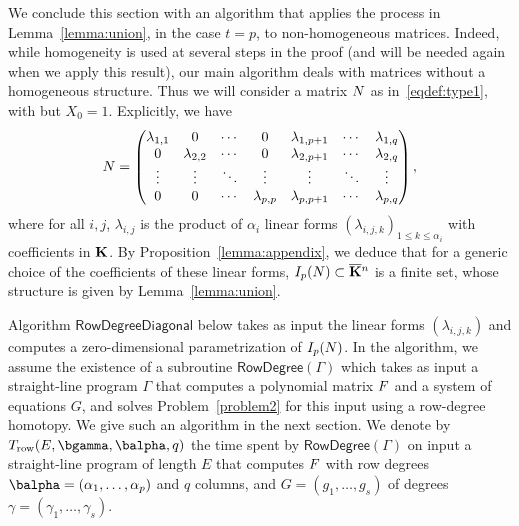 \documentclass[12pt]{article}
\begin{document}
\medskip

We conclude this section with an algorithm that applies the process
in Lemma~\ref{lemma:union}, in the case $t=p$, to non-homogeneous 
matrices. Indeed, while homogeneity is used at several steps in 
the proof (and will be needed again when we apply this result), our 
main algorithm deals with matrices without a homogeneous structure.
Thus we will consider a matrix ${N}$ as in~\eqref{eqdef:type1},
with but $X_0=1$. Explicitly, we have
\begin{align}\label{eqdef:type1aff}
{N}= \left( \begin{matrix}
\lambda_{1,1} & 0 & \cdots & 0 & \lambda_{1,p+1} & \cdots & \lambda_{1, q}\\
0 & \lambda_{2,2} & \cdots & 0 & \lambda_{2,p+1} & \cdots & \lambda_{2, q}\\
\vdots & \vdots & \ddots & \vdots & \vdots & \ddots & \vdots\\
0 & 0 & \cdots & \lambda_{p,p} & \lambda_{p,p+1} & \cdots & \lambda_{p, q}
\end{matrix} \right),
\end{align}
where for all $i,j$, $\lambda_{i,j}$ is the product of $\alpha_i$
linear forms $(\lambda_{i,j,k})_{1 \le k \le \alpha_i}$ with
coefficients in $\mathbf{K}$.  By Proposition~\ref{lemma:appendix}, we deduce
that for a generic choice of the coefficients of these linear forms,
$I_p({N}) \subset \overline{\mathbf{K}}{}^n$ is a finite set, whose structure is
given by Lemma~\ref{lemma:union}.

Algorithm $\mathsf{RowDegreeDiagonal}$ below takes as input the linear
forms $(\lambda_{i,j,k})$ and computes a zero-dimensional
parametrization of $I_p({N})$. In the algorithm, we assume the
existence of a subroutine $\mathsf{RowDegree}(\Gamma)$ which takes as
input a straight-line program $\Gamma$ that computes a polynomial
matrix ${F}$ and a system of equations $G$, and solves
Problem~\ref{problem2} for this input using a row-degree homotopy. We
give such an algorithm in the next section. We denote by $T_{\rm
  row}(E,\bgamma,\balpha,q)$ the time spent by
$\mathsf{RowDegree}(\Gamma)$ on input a straight-line program of
length $E$ that computes ${F}$ with row degrees
$\balpha=(\alpha_1,\dots,\alpha_p)$ and $q$ columns, and
$G=(g_1,\dots,g_s)$ of degrees $\gamma=(\gamma_1,\dots,\gamma_s)$.
\end{document}
